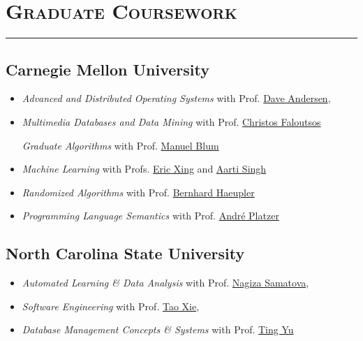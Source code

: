 \documentclass{article}
\newcommand{\HRule}{\rule{\linewidth}{0.5mm}}
\begin{document}
\section*{\bf \textsc{Graduate Coursework}}
\vspace{-5mm}\HRule
\subsection*{\bf {Carnegie Mellon University}}

\begin{itemize}
\item \emph{Advanced and Distributed Operating Systems} with Prof. \href{http://www.cs.cmu.edu/~dga}{Dave Andersen},

\item \emph{Multimedia Databases and Data Mining} with Prof. \href{http://www.cs.cmu.edu/~christos}{Christos Faloutsos}

\emph{Graduate Algorithms} with Prof. \href{http://www.cs.cmu.edu/~mblum}{Manuel Blum}

\item \emph{Machine Learning} with Profs. \href{http://www.cs.cmu.edu/~epxing}{Eric Xing} and \href{http://www.cs.cmu.edu/~aarti}{Aarti Singh}

\item \emph{Randomized Algorithms} with Prof. \href{http://www.cs.cmu.edu/~haeupler}{Bernhard Haeupler}

\item \emph{Programming Language Semantics} with Prof. \href{http://www.cs.cmu.edu/~aplatzer}{Andr{\'e} Platzer}
\end{itemize}


\subsection*{\bf {North Carolina State University}}

\begin{itemize}
\item \emph{Automated Learning \& Data Analysis} with Prof. \href{http://www.csc.ncsu.edu/people/nfsamato}{Nagiza Samatova}, 
 
\item \emph{Software Engineering} with Prof. \href{http://web.engr.illinois.edu/~taoxie}{Tao Xie}, 

\item \emph{Database Management Concepts \& Systems} with Prof. \href{http://www.csc.ncsu.edu/people/tyu}{Ting Yu}
\end{itemize}
\end{document}
